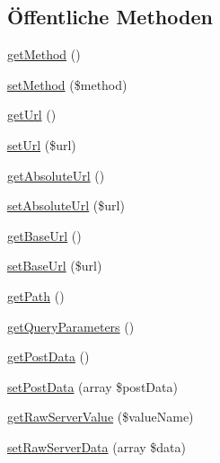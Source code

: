 \subsection*{Öffentliche Methoden}
\begin{DoxyCompactItemize}
\item 
\mbox{\hyperlink{interface_sabre_1_1_h_t_t_p_1_1_request_interface_a261109b4898971242fccc2097a880131}{get\+Method}} ()
\item 
\mbox{\hyperlink{interface_sabre_1_1_h_t_t_p_1_1_request_interface_a91dcec67206436b8439e0256b6388da0}{set\+Method}} (\$method)
\item 
\mbox{\hyperlink{interface_sabre_1_1_h_t_t_p_1_1_request_interface_a0b28a29e4efe43665cc2f23fbac62570}{get\+Url}} ()
\item 
\mbox{\hyperlink{interface_sabre_1_1_h_t_t_p_1_1_request_interface_aa588eaadc450324b11562119bb1933a0}{set\+Url}} (\$url)
\item 
\mbox{\hyperlink{interface_sabre_1_1_h_t_t_p_1_1_request_interface_a8c8267e6a7d901a0f63f66a2ecc59a91}{get\+Absolute\+Url}} ()
\item 
\mbox{\hyperlink{interface_sabre_1_1_h_t_t_p_1_1_request_interface_a83a1eb456bef5552d0cbaae761f91ac1}{set\+Absolute\+Url}} (\$url)
\item 
\mbox{\hyperlink{interface_sabre_1_1_h_t_t_p_1_1_request_interface_af5683bbd6dfff74d91ac4620ae328feb}{get\+Base\+Url}} ()
\item 
\mbox{\hyperlink{interface_sabre_1_1_h_t_t_p_1_1_request_interface_a1666fb35c3bad57838f187bf40105be4}{set\+Base\+Url}} (\$url)
\item 
\mbox{\hyperlink{interface_sabre_1_1_h_t_t_p_1_1_request_interface_aea4dd5571c841fa1e41b05813299bae4}{get\+Path}} ()
\item 
\mbox{\hyperlink{interface_sabre_1_1_h_t_t_p_1_1_request_interface_a9e54c49278b75692ba00bd4f5932856f}{get\+Query\+Parameters}} ()
\item 
\mbox{\hyperlink{interface_sabre_1_1_h_t_t_p_1_1_request_interface_ae33360454f0d43e566b76de24682af33}{get\+Post\+Data}} ()
\item 
\mbox{\hyperlink{interface_sabre_1_1_h_t_t_p_1_1_request_interface_a4ba8b65d991c82677688a785a9d4014a}{set\+Post\+Data}} (array \$post\+Data)
\item 
\mbox{\hyperlink{interface_sabre_1_1_h_t_t_p_1_1_request_interface_a96c2cbeb9c1e9c3431c0f98bc7c7d93c}{get\+Raw\+Server\+Value}} (\$value\+Name)
\item 
\mbox{\hyperlink{interface_sabre_1_1_h_t_t_p_1_1_request_interface_a025c72064e34e843a8fd402e6407894c}{set\+Raw\+Server\+Data}} (array \$data)
\end{DoxyCompactItemize}


